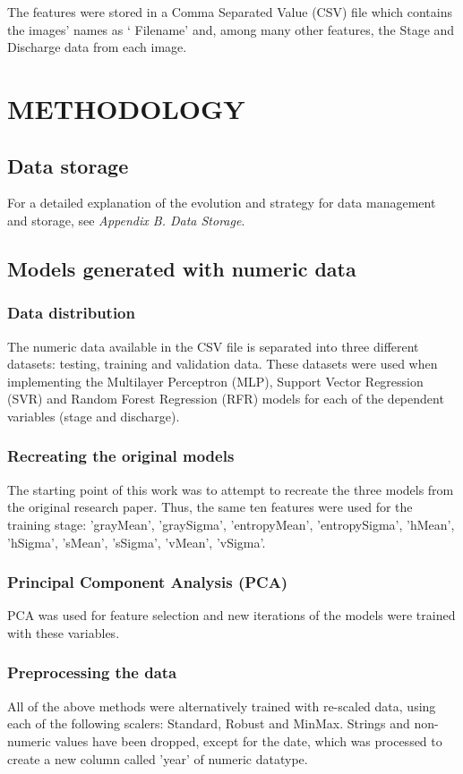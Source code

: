 \documentclass[conference]{IEEEtran}
\begin{document}
The features were stored in a Comma Separated Value (CSV) file which contains the images’ names as ‘ Filename’ and, among many other features, the Stage and Discharge data from each image.

\section{METHODOLOGY}
\subsection{\textbf{Data storage}}
For a detailed explanation of the evolution and strategy for data management and storage, see \textit{Appendix B. Data Storage}.
\subsection{\textbf{Models generated with numeric data}}
\subsubsection{Data distribution}
The numeric data available in the CSV file is separated into three different datasets: testing, training and validation data.
These datasets were used when implementing the Multilayer Perceptron (MLP), Support Vector Regression (SVR) and Random Forest Regression (RFR) models for each of the dependent variables (stage and discharge).
\subsubsection{Recreating the original models}
The starting point of this work was to attempt to recreate the three models from the original research paper. Thus, the same ten features were used for the training stage: 'grayMean', 'graySigma', 'entropyMean', 'entropySigma', 'hMean', 'hSigma', 'sMean', 'sSigma', 'vMean', 'vSigma'.
\subsubsection{Principal Component Analysis (PCA)}
PCA was used for feature selection and new iterations of the models were trained with these variables.
\subsubsection{Preprocessing the data}
All of the above methods were alternatively trained with re-scaled data, using each of the following scalers: Standard, Robust and MinMax. Strings and non-numeric values have been dropped, except for the date, which was processed to create a new column called 'year' of numeric datatype.
\end{document}
